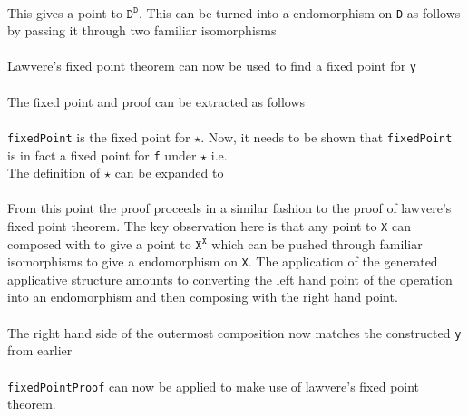 \begin{AgdaMultiCode}
\\
This gives a point to $\texttt{D}^\texttt{D}$. This can be turned into a
endomorphism on \verb|D| as follows by passing it through two familiar
isomorphisms
\\
\\
Lawvere's fixed point theorem can now be used to find a fixed point for
\verb|y|
\\
\\
The fixed point and proof can be extracted as follows
\\
\\
\verb|fixedPoint| is the fixed point for $\star$. Now, it needs to be shown that
\verb|fixedPoint| is in fact a fixed point for \verb|f| under $\star$ i.e.
\\
The definition of $\star$ can be expanded to
\\
\\
From this point the proof proceeds in a similar fashion to the proof of
lawvere's fixed point theorem. The key observation here is that any point to
\verb|X| can composed with  to give a point to
$\texttt{X}^{\texttt{X}}$ which can be pushed through familiar isomorphisms to
give a endomorphism on \verb|X|. The application of the generated applicative
structure amounts to converting the left hand point of the operation into an
endomorphism and then composing with the right hand point.
\\
\\
The right hand side of the outermost composition now matches the constructed
\verb|y| from earlier \\
 \\
\verb|fixedPointProof| can now be applied to make use of lawvere's fixed point
theorem. \\
\end{AgdaMultiCode}

